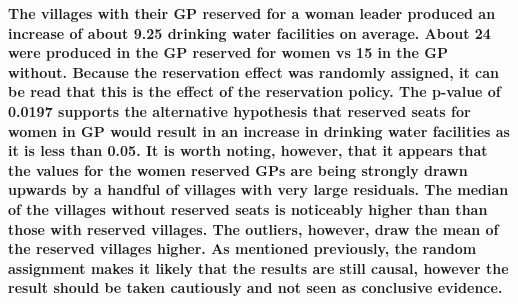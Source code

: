 \documentclass[12pt,letterpaper]{article}
\begin{document}
\begin{enumerate}
	\textbf {The villages with their GP reserved for a woman leader produced an increase of about 9.25 drinking water facilities on average. About 24 were produced in the GP reserved for women vs 15 in the GP without. Because the reservation effect was randomly assigned, it can be read that this is the effect of the reservation policy. The p-value of 0.0197 supports the alternative hypothesis that reserved seats for women in GP would result in an increase in drinking water facilities as it is less than 0.05. It is worth noting, however, that it appears that the values for the women reserved GPs are being strongly drawn upwards by a handful of villages with very large residuals. The median of the villages without reserved seats is noticeably higher than than those with reserved villages. The outliers, however, draw the mean of the reserved villages higher. As mentioned previously, the random assignment makes it likely that the results are still causal, however the result should be taken cautiously and not seen as conclusive evidence.}
	
\end{enumerate}


\end{document}
